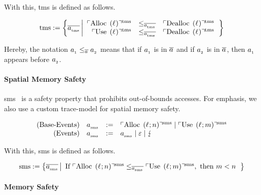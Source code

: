 With this, \gls*{tms} is defined as follows.
\begin{definition}{}
  \[
  \tmssafe:=\left\{\tmsTrace
    \left| 
      \begin{array}{rcl}
        \tmsAlloc&\le_{\tmsTrace}&\tmsDealloc \\
        \tmsUse&\le_{\tmsTrace}&\tmsDealloc \\
      \end{array}
    \right.
  \right\}
  \]
\end{definition}
Hereby, the notation $\varEvent[_{1}]\le_{\varTrace}\varEvent[_{2}]$ means that if $\varEvent[_{1}]$ is in $\varTrace$ and if $\varEvent[_{2}]$ is in $\varTrace$, then $\varEvent[_{1}]$ appears before $\varEvent[_{2}]$.

\paragraph{Spatial Memory Safety}
\gls*{sms}~\cite{nagarakatte2009soft} is a safety property that prohibits out-of-bounds accesses.
For emphasis, we also use a custom trace-model for spatial memory safety.
\begin{definition}{}
\[
  \begin{array}{rcll}
    \text{(Base-Events)}&\smsEvent &:=& \smsAlloc \mid \smsUse \\
    \text{(Events)}&\smsEvent &:=& \smsEvent \mid \emptyevent \mid \lightning \\ 
  \end{array}
\]
\end{definition}

With this, \gls*{sms} is defined as follows.
\begin{definition}{}
  \[
  \smssafe:=\left\{\smsTrace \left|\begin{array}{rcl}
      \text{If }\smsAlloc\le_{\smsTrace}\smsUse, \text{ then }m<n
  \end{array}\right.\right\}
  \]
\end{definition}

\paragraph{Memory Safety}

